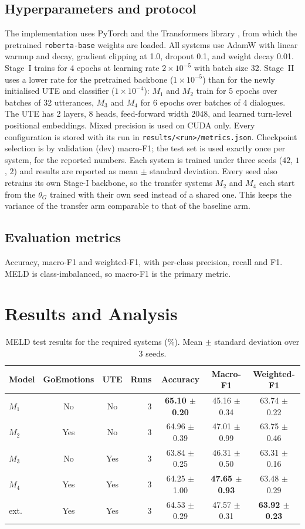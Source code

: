 \documentclass[sigconf,nonacm]{acmart}
\begin{document}
\subsection{Hyperparameters and protocol}
The implementation uses PyTorch \citep{paszke2019pytorch} and the Transformers library
\citep{wolf2020transformers}, from which the pretrained \texttt{roberta-base} weights are
loaded. All systems use AdamW with linear warmup and decay, gradient clipping at 1.0, dropout 0.1,
and weight decay 0.01. Stage~I trains for 4 epochs at learning rate $2\times10^{-5}$ with
batch size 32. Stage~II uses a lower rate for the pretrained backbone
($1\times10^{-5}$) than for the newly initialised UTE and classifier
($1\times10^{-4}$): $M_1$ and $M_2$ train for 5 epochs over batches of 32 utterances,
$M_3$ and $M_4$ for 6 epochs over batches of 4 dialogues. The UTE has 2 layers, 8 heads,
feed-forward width 2048, and learned turn-level positional embeddings. Mixed precision is
used on CUDA only. Every configuration is stored with its run in
\texttt{results/<run>/metrics.json}. Checkpoint selection is by validation (dev) macro-F1;
the test set is used exactly once per system, for the reported numbers. Each system is
trained under three seeds ($42$, $1$, $2$) and results are reported as mean $\pm$ standard
deviation. Every seed also retrains its own Stage-I backbone, so the transfer systems
$M_2$ and $M_4$ each start from the $\theta_G$ trained with their own seed instead of a
shared one. This keeps the variance of the transfer arm comparable to that of the baseline arm.

\subsection{Evaluation metrics}
Accuracy, macro-F1 and weighted-F1, with per-class precision, recall and F1. MELD is
class-imbalanced, so macro-F1 is the primary metric.

\section{Results and Analysis}
\begin{table}[t]
\centering
\caption{MELD test results for the required systems (\%). Mean $\pm$ standard deviation over 3 seeds.}
\label{tab:main}
\begin{tabular}{lccrccc}
\toprule
Model & GoEmotions & UTE & Runs & Accuracy & Macro-F1 & Weighted-F1 \\
\midrule
$M_1$ & No & No & 3 & \textbf{65.10 $\pm$ 0.20} & 45.16 $\pm$ 0.34 & 63.74 $\pm$ 0.22 \\
$M_2$ & Yes & No & 3 & 64.96 $\pm$ 0.39 & 47.01 $\pm$ 0.99 & 63.75 $\pm$ 0.46 \\
$M_3$ & No & Yes & 3 & 63.84 $\pm$ 0.25 & 46.31 $\pm$ 0.50 & 63.31 $\pm$ 0.16 \\
$M_4$ & Yes & Yes & 3 & 64.25 $\pm$ 1.00 & \textbf{47.65 $\pm$ 0.93} & 63.48 $\pm$ 0.29 \\
ext. & Yes & Yes & 3 & 64.53 $\pm$ 0.29 & 47.57 $\pm$ 0.31 & \textbf{63.92 $\pm$ 0.23} \\
\bottomrule
\end{tabular}
\end{table}
\end{document}

